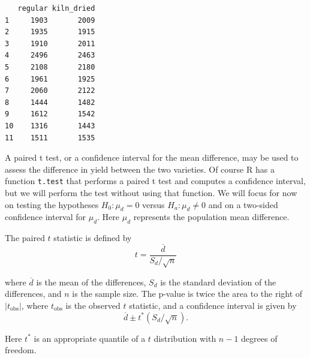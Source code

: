 \documentclass[]{krantz}
\makeatletter
\newenvironment{Shaded}{\begin{snugshade}}{\end{snugshade}}
\newcommand{\KeywordTok}[1]{\textcolor[rgb]{0.27,0.27,0.27}{\textbf{#1}}}
\newcommand{\NormalTok}[1]{#1}
\newcommand{\OperatorTok}[1]{\textcolor[rgb]{0.43,0.43,0.43}{\textbf{#1}}}
\newcommand{\StringTok}[1]{\textcolor[rgb]{0.5,0.5,0.5}{#1}}
\newenvironment{kframe}{%
\medskip{}
\setlength{\fboxsep}{.8em}
 \def\at@end@of@kframe{}%
 \ifinner\ifhmode%
  \def\at@end@of@kframe{\end{minipage}}%
  \begin{minipage}{\columnwidth}%
 \fi\fi%
 \def\FrameCommand##1{\hskip\@totalleftmargin \hskip-\fboxsep
 \colorbox{shadecolor}{##1}\hskip-\fboxsep
     \hskip-\linewidth \hskip-\@totalleftmargin \hskip\columnwidth}%
 \MakeFramed {\advance\hsize-\width
   \@totalleftmargin\z@ \linewidth\hsize
   \@setminipage}}%
 {\par\unskip\endMakeFramed%
 \at@end@of@kframe}
\renewenvironment{Shaded}{\begin{kframe}}{\end{kframe}}
\makeatother
\begin{document}
\begin{verbatim}
   regular kiln_dried
1     1903       2009
2     1935       1915
3     1910       2011
4     2496       2463
5     2108       2180
6     1961       1925
7     2060       2122
8     1444       1482
9     1612       1542
10    1316       1443
11    1511       1535
\end{verbatim}

A paired t test, or a confidence interval for the mean difference, may be used to assess the difference in yield between the two varieties. Of course R has a function \texttt{t.test} that performs a paired t test and computes a confidence interval, but we will perform the test without using that function. We will focus for now on testing the hypotheses \(H_0\colon \mu_d = 0\) versus \(H_a\colon \mu_d \neq 0\) and on a two-sided confidence interval for \(\mu_d\). Here \(\mu_d\) represents the population mean difference.

The paired \(t\) statistic is defined by
\begin{equation}
t = \frac{\overline d}{S_d/\sqrt{n}}
\end{equation}

where \(\overline d\) is the mean of the differences, \(S_d\) is the standard deviation of the differences, and \(n\) is the sample size. The p-value is twice the area to the right of \(|t_{\text{obs}}|\), where \(t_{\text{obs}}\) is the observed \(t\) statistic, and a confidence interval is given by
\begin{equation}
\overline d \pm t^* (S_d/\sqrt{n}).
\end{equation}

Here \(t^*\) is an appropriate quantile of a \(t\) distribution with \(n-1\) degrees of freedom.

\begin{Shaded}
\end{Shaded}
\end{document}
